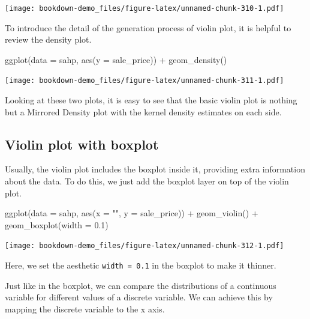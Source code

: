 \documentclass[
]{book}
\newenvironment{Shaded}{\begin{snugshade}}{\end{snugshade}}
\newcommand{\AttributeTok}[1]{\textcolor[rgb]{0.77,0.63,0.00}{#1}}
\newcommand{\FloatTok}[1]{\textcolor[rgb]{0.00,0.00,0.81}{#1}}
\newcommand{\FunctionTok}[1]{\textcolor[rgb]{0.00,0.00,0.00}{#1}}
\newcommand{\NormalTok}[1]{#1}
\newcommand{\SpecialCharTok}[1]{\textcolor[rgb]{0.00,0.00,0.00}{#1}}
\newcommand{\StringTok}[1]{\textcolor[rgb]{0.31,0.60,0.02}{#1}}
\begin{document}
\texttt{[image: bookdown-demo\_files/figure-latex/unnamed-chunk-310-1.pdf]}

To introduce the detail of the generation process of violin plot, it is helpful to review the density plot.

\begin{Shaded}
\begin{Highlighting}[]
\FunctionTok{ggplot}\NormalTok{(}\AttributeTok{data =}\NormalTok{ sahp, }\FunctionTok{aes}\NormalTok{(}\AttributeTok{y =}\NormalTok{ sale\_price)) }\SpecialCharTok{+} \FunctionTok{geom\_density}\NormalTok{()}
\end{Highlighting}
\end{Shaded}

\texttt{[image: bookdown-demo\_files/figure-latex/unnamed-chunk-311-1.pdf]}

Looking at these two plots, it is easy to see that the basic violin plot is nothing but a Mirrored Density plot with the kernel density estimates on each side.

\hypertarget{violin-plot-with-boxplot}{%
\subsection{Violin plot with boxplot}\label{violin-plot-with-boxplot}}

Usually, the violin plot includes the boxplot inside it, providing extra information about the data. To do this, we just add the boxplot layer on top of the violin plot.

\begin{Shaded}
\begin{Highlighting}[]
\FunctionTok{ggplot}\NormalTok{(}\AttributeTok{data =}\NormalTok{ sahp, }\FunctionTok{aes}\NormalTok{(}\AttributeTok{x =} \StringTok{""}\NormalTok{, }\AttributeTok{y =}\NormalTok{ sale\_price)) }\SpecialCharTok{+} 
  \FunctionTok{geom\_violin}\NormalTok{() }\SpecialCharTok{+}
  \FunctionTok{geom\_boxplot}\NormalTok{(}\AttributeTok{width =} \FloatTok{0.1}\NormalTok{)}
\end{Highlighting}
\end{Shaded}

\texttt{[image: bookdown-demo\_files/figure-latex/unnamed-chunk-312-1.pdf]}

Here, we set the aesthetic \texttt{width\ =\ 0.1} in the boxplot to make it thinner.

Just like in the boxplot, we can compare the distributions of a continuous variable for different values of a discrete variable. We can achieve this by mapping the discrete variable to the x axis.
\end{document}
